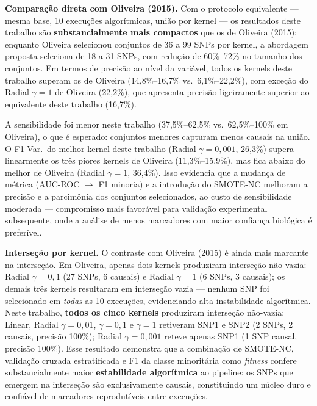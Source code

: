 \documentclass[
    12pt,
    a4paper,
    oneside,
    english,
    french,
    spanish,
    brazil
    ]{abntex2}
\newcommand{\novo}[1]{\textcolor{corNova}{#1}}
\begin{document}
\novo{\textbf{Comparação direta com Oliveira (2015).}
Com o protocolo equivalente --- mesma base, 10 execuções algorítmicas, união por kernel --- os resultados deste trabalho são \textbf{substancialmente mais compactos} que os de Oliveira (2015): enquanto Oliveira selecionou conjuntos de 36 a 99 SNPs por kernel, a abordagem proposta seleciona de 18 a 31 SNPs, com redução de 60\%--72\% no tamanho dos conjuntos. Em termos de precisão ao nível da variável, todos os kernels deste trabalho superam os de Oliveira (14,8\%--16,7\% vs.\ 6,1\%--22,2\%), com exceção do Radial $\gamma=1$ de Oliveira (22,2\%), que apresenta precisão ligeiramente superior ao equivalente deste trabalho (16,7\%).}

\novo{A sensibilidade foi menor neste trabalho (37,5\%--62,5\% vs.\ 62,5\%--100\% em Oliveira), o que é esperado: conjuntos menores capturam menos causais na união. O F1 Var.\ do melhor kernel deste trabalho (Radial $\gamma=0{,}001$, 26,3\%) supera linearmente os três piores kernels de Oliveira (11,3\%--15,9\%), mas fica abaixo do melhor de Oliveira (Radial $\gamma=1$, 36,4\%). Isso evidencia que a mudança de métrica (AUC-ROC $\to$ F1 minoria) e a introdução do SMOTE-NC melhoram a precisão e a parcimônia dos conjuntos selecionados, ao custo de sensibilidade moderada --- compromisso mais favorável para validação experimental subsequente, onde a análise de menos marcadores com maior confiança biológica é preferível.}

\novo{\textbf{Interseção por kernel.} O contraste com Oliveira (2015) é ainda mais marcante na interseção. Em Oliveira, apenas dois kernels produziram interseção não-vazia: Radial $\gamma=0{,}1$ (27 SNPs, 6 causais) e Radial $\gamma=1$ (6 SNPs, 3 causais); os demais três kernels resultaram em interseção vazia --- nenhum SNP foi selecionado em \emph{todas} as 10 execuções, evidenciando alta instabilidade algorítmica. Neste trabalho, \textbf{todos os cinco kernels} produziram interseção não-vazia: Linear, Radial $\gamma=0{,}01$, $\gamma=0{,}1$ e $\gamma=1$ retiveram SNP1 e SNP2 (2 SNPs, 2 causais, precisão 100\%); Radial $\gamma=0{,}001$ reteve apenas SNP1 (1 SNP causal, precisão 100\%). Esse resultado demonstra que a combinação de SMOTE-NC, validação cruzada estratificada e F1 da classe minoritária como \textit{fitness} confere substancialmente maior \textbf{estabilidade algorítmica} ao pipeline: os SNPs que emergem na interseção são exclusivamente causais, constituindo um núcleo duro e confiável de marcadores reprodutíveis entre execuções.}

\end{document}
